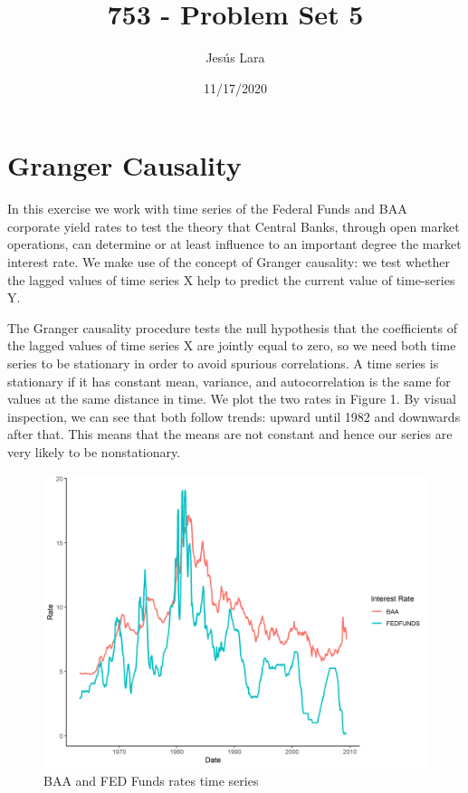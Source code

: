 \documentclass[
]{article}
\title{753 - Problem Set 5}
\author{Jesús Lara}
\date{11/17/2020}
\begin{document}
\maketitle

\hypertarget{granger-causality}{%
\section{Granger Causality}\label{granger-causality}}

In this exercise we work with time series of the Federal Funds and BAA
corporate yield rates to test the theory that Central Banks, through
open market operations, can determine or at least influence to an
important degree the market interest rate. We make use of the concept of
Granger causality: we test whether the lagged values of time series X
help to predict the current value of time-series Y.

The Granger causality procedure tests the null hypothesis that the
coefficients of the lagged values of time series X are jointly equal to
zero, so we need both time series to be stationary in order to avoid
spurious correlations. A time series is stationary if it has constant
mean, variance, and autocorrelation is the same for values at the same
distance in time. We plot the two rates in Figure 1. By visual
inspection, we can see that both follow trends: upward until 1982 and
downwards after that. This means that the means are not constant and
hence our series are very likely to be nonstationary.

\begin{figure}

{\centering \includegraphics[width=0.75\linewidth]{BAA.FEDFUNDS.time.series} 

}

\caption{BAA and FED Funds rates time series}\label{fig:unnamed-chunk-2}
\end{figure}
\end{document}
